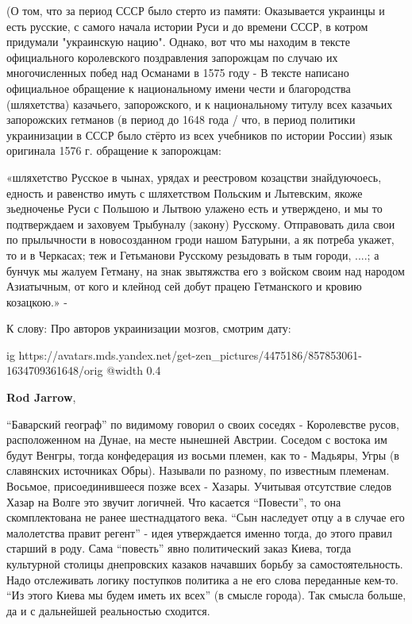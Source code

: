 \begin{itemize}
\begin{itemize}
(О том, что за период СССР было стерто из памяти: Оказывается украинцы и есть
русские, с самого начала истории Руси и до времени СССР, в котром придумали
"украинскую нацию". Однако, вот что мы находим в тексте официального
королевского поздравления запорожцам по случаю их многочисленных побед над
Османами в 1575 году - В тексте написано официальное обращение к национальному
имени чести и благородства (шляхетства) казачьего, запорожского, и к
национальному титулу всех казачьих запорожских гетманов (в период до 1648 года
/ что, в период политики украинизации в СССР было стёрто из всех учебников по
истории России) язык оригинала 1576 г. обращение к запорожцам:

«шляхетство Русское в чынах, урядах и реестровом козацстви знайдуючоесь,
едность и равенство имуть с шляхетством Польским и Лытевским, якоже зьедноченье
Руси с Польшою и Лытвою улажено есть и утверждено, и мы то подтверждаем и
заховуем Трыбуналу (закону) Русскому. Отправовать дила свои по прылычности в
новосозданном гроди нашом Батурыни, а як потреба укажет, то и в Черкасах; теж и
Гетьманови Русскому резыдовать в тым городи, ....; а бунчук мы жалуем Гетману,
на знак звытяжства его з войском своим над народом Азиатычным, от кого и
клейнод сей добут працею Гетманского и кровию козацкою.» -

К слову: Про авторов украинизации мозгов, смотрим дату:

\ifcmt
  ig https://avatars.mds.yandex.net/get-zen_pictures/4475186/857853061-1634709361648/orig
  @width 0.4
\fi

\textbf{Rod Jarrow}, 

\enquote{Баварский географ} по видимому говорил о своих соседях - Королевстве русов,
расположенном на Дунае, на месте нынешней Австрии. Соседом с востока им будут
Венгры, тогда конфедерация из восьми племен, как то - Мадьяры, Угры (в
славянских источниках Обры). Называли по разному, по известным
племенам. Восьмое, присоединившееся позже всех - Хазары. Учитывая отсутствие
следов Хазар на Волге это звучит логичней. Что касается \enquote{Повести}, то она
скомплектована не ранее шестнадцатого века. \enquote{Сын наследует отцу а в случае его
малолетства правит регент} - идея утверждается именно тогда, до этого правил
старший в роду. Сама \enquote{повесть} явно политический заказ Киева, тогда культурной
столицы днепровских казаков начавших борьбу за самостоятельность. Надо
отслеживать логику поступков политика а не его слова переданные кем-то. \enquote{Из
этого Киева мы будем иметь их всех} (в смысле города). Так смысла больше, да и
с дальнейшей реальностью сходится.


\end{itemize}
\end{itemize}

